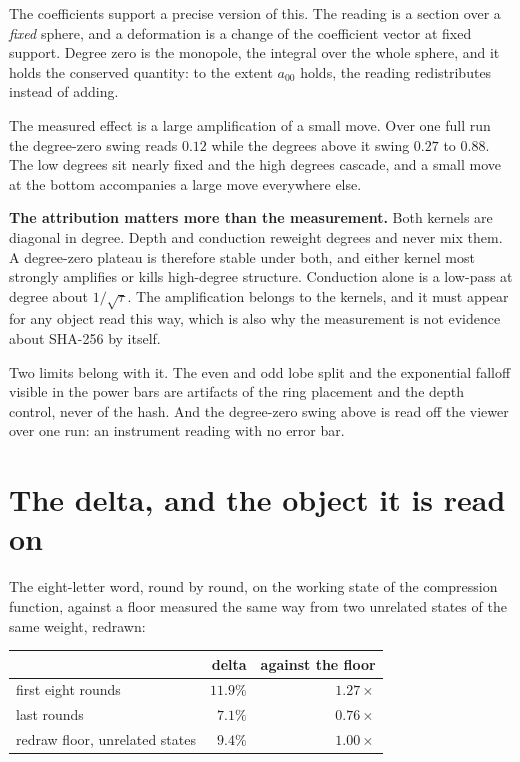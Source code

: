 The coefficients support a precise version of this. The reading is a section over a \emph{fixed} sphere, and a deformation is a change of the coefficient vector at fixed support. Degree zero is the monopole, the integral over the whole sphere, and it holds the conserved quantity: to the extent \(a_{00}\) holds, the reading redistributes instead of adding.

The measured effect is a large amplification of a small move. Over one full run the degree-zero swing reads \(0.12\) while the degrees above it swing \(0.27\) to \(0.88\). The low degrees sit nearly fixed and the high degrees cascade, and a small move at the bottom accompanies a large move everywhere else.

\textbf{The attribution matters more than the measurement.} Both kernels are diagonal in degree. Depth and conduction reweight degrees and never mix them. A degree-zero plateau is therefore stable under both, and either kernel most strongly amplifies or kills high-degree structure. Conduction alone is a low-pass at degree about \(1/\sqrt{\tau}\). The amplification belongs to the kernels, and it must appear for any object read this way, which is also why the measurement is not evidence about SHA-256 by itself.

Two limits belong with it. The even and odd lobe split and the exponential falloff visible in the power bars are artifacts of the ring placement and the depth control, never of the hash. And the degree-zero swing above is read off the viewer over one run: an instrument reading with no error bar.

\section{The delta, and the object it is read on}

The eight-letter word, round by round, on the working state of the compression function, against a floor measured the same way from two unrelated states of the same weight, redrawn:

\begin{center}
\begin{tabular}{lrr}
\toprule
 & delta & against the floor \\
\midrule
first eight rounds & \(11.9\%\) & \(1.27\times\) \\
last rounds & \(7.1\%\) & \(0.76\times\) \\
redraw floor, unrelated states & \(9.4\%\) & \(1.00\times\) \\
\bottomrule
\end{tabular}
\end{center}

